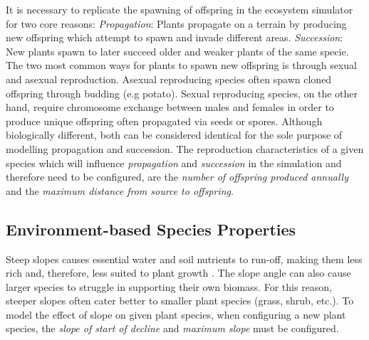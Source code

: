 It is necessary to replicate the spawning of offspring in the ecosystem simulator for two core reasons: \textit{Propagation}: Plants propagate on a terrain by producing new offspring which attempt to spawn and invade different areas. \textit{Succession}: New plants spawn to later succeed older and weaker plants of the same specie.\\ 
The two most common ways for plants to spawn new offspring is through sexual and asexual reproduction. Asexual reproducing species often spawn cloned offspring through budding (e.g potato). Sexual reproducing species, on the other hand, require chromosome exchange between males and females in order to produce unique offspring often propagated via seeds or spores. Although biologically different, both can be considered identical for the sole purpose of modelling propagation and succession. The reproduction characteristics of a given species which will influence \textit{propagation} and \textit{succession} in the simulation and therefore need to be configured, are the \textit{number of offspring produced annually} and the \textit{maximum distance from source to offspring}.\\

\subsection{Environment-based Species Properties}

Steep slopes causes essential water and soil nutrients to run-off, making them less rich and, therefore, less suited to plant growth \cite{Kapolka2001}. The slope angle can also cause larger species to struggle in supporting their own biomass. For this reason, steeper slopes often cater better to smaller plant species (grass, shrub, etc.). To model the effect of slope on given plant species, when configuring a new plant species, the \textit{slope of start of decline} and \textit{maximum slope} must be configured.\\


